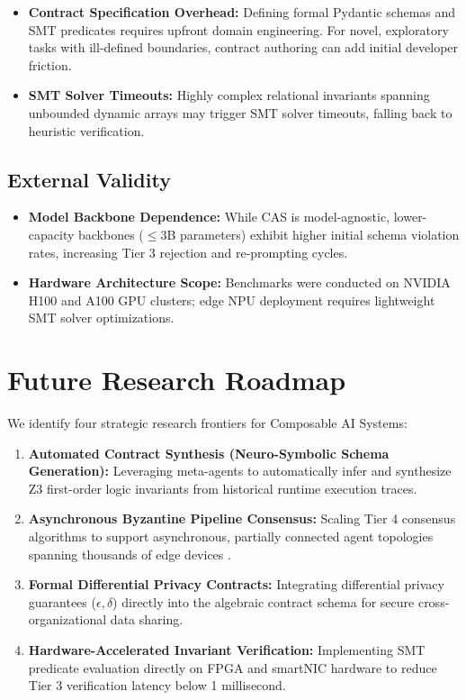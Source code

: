 \documentclass[10pt,journal,compsoc,twocolumn]{IEEEtran}
\begin{document}
\begin{itemize}
  \item \textbf{Contract Specification Overhead:} Defining formal Pydantic schemas and SMT predicates requires upfront domain engineering. For novel, exploratory tasks with ill-defined boundaries, contract authoring can add initial developer friction.
  \item \textbf{SMT Solver Timeouts:} Highly complex relational invariants spanning unbounded dynamic arrays may trigger SMT solver timeouts, falling back to heuristic verification.
\end{itemize}


\subsection{External Validity}

\begin{itemize}
  \item \textbf{Model Backbone Dependence:} While CAS is model-agnostic, lower-capacity backbones ($\le 3$B parameters) exhibit higher initial schema violation rates, increasing Tier 3 rejection and re-prompting cycles.
  \item \textbf{Hardware Architecture Scope:} Benchmarks were conducted on NVIDIA H100 and A100 GPU clusters; edge NPU deployment requires lightweight SMT solver optimizations.
\end{itemize}




\section{Future Research Roadmap}


We identify four strategic research frontiers for Composable AI Systems:
\begin{enumerate}
  \item \textbf{Automated Contract Synthesis (Neuro-Symbolic Schema Generation):} Leveraging meta-agents to automatically infer and synthesize Z3 first-order logic invariants from historical runtime execution traces.
  \item \textbf{Asynchronous Byzantine Pipeline Consensus:} Scaling Tier 4 consensus algorithms to support asynchronous, partially connected agent topologies spanning thousands of edge devices \cite{crossref_10_1109_access_2026_3656309}.
  \item \textbf{Formal Differential Privacy Contracts:} Integrating differential privacy guarantees ($\epsilon, \delta$) directly into the algebraic contract schema for secure cross-organizational data sharing.
  \item \textbf{Hardware-Accelerated Invariant Verification:} Implementing SMT predicate evaluation directly on FPGA and smartNIC hardware to reduce Tier 3 verification latency below 1 millisecond.
\end{enumerate}
\end{document}
